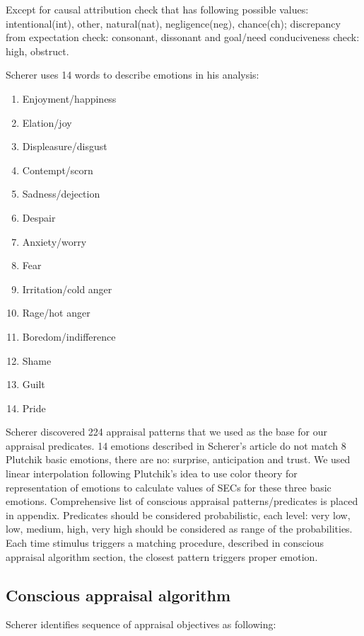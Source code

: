 Except for causal attribution check that has following possible values: intentional(int), other, natural(nat), negligence(neg), chance(ch);  discrepancy from expectation check: consonant, dissonant and goal/need conduciveness check: high, obstruct.

Scherer uses 14 words to describe emotions in his analysis:

\begin{enumerate}
 \item  Enjoyment/happiness
 \item  Elation/joy
 \item  Displeasure/disgust
 \item  Contempt/scorn
 \item  Sadness/dejection
 \item  Despair
 \item  Anxiety/worry
 \item  Fear
 \item  Irritation/cold anger
 \item  Rage/hot anger
 \item  Boredom/indifference
 \item  Shame
 \item  Guilt
 \item  Pride
\end{enumerate}

Scherer discovered 224 appraisal patterns that we used as the base for our appraisal predicates. 14 emotions described in Scherer's article do not match 8 Plutchik basic emotions, there are no: surprise, anticipation and trust. We used linear interpolation following Plutchik's idea to use color theory for representation of emotions to calculate values of SECs for these three basic emotions. Comprehensive list of conscious appraisal patterns/predicates is placed in appendix. Predicates should be considered probabilistic, each level: very low, low, medium, high, very high should be considered as range of the probabilities. Each time stimulus triggers a matching procedure, described in conscious appraisal algorithm section, the closest pattern triggers proper emotion.

\subsection{Conscious appraisal algorithm}

Scherer identifies \cite{appraisal_considered_as_a_process} sequence of appraisal objectives as following:

